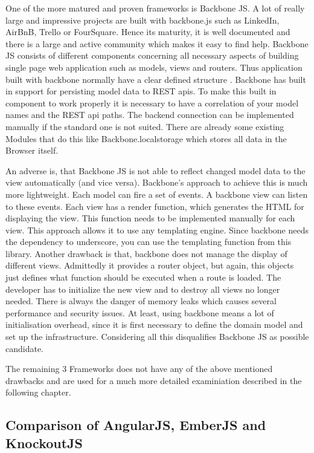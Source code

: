 One of the more matured and proven frameworks is Backbone JS.
A lot of really large and impressive projects are built with backbone.js such as LinkedIn, AirBnB, Trello or FourSquare.
Hence its maturity, it is well documented and there is a large and active community which makes it easy to find help.
Backbone JS  consists of different components concerning all necessary aspects of building single page web application such as models, views and routers.
Thus application built with backbone normally have a clear defined structure \autocite{tech-ana:heise-backbone}.
Backbone has built in support for persisting model data to REST apis.
To make this built in component to work properly it is necessary to have a correlation of your model names and the REST api paths.
The backend connection can be implemented manually if the standard one is not suited.
There are already some existing Modules that do this like Backbone.localstorage which stores all data in the Browser itself.

An adverse is, that Backbone JS is not able to reflect changed model data to the view automatically (and vice versa).
Backbone's approach to achieve this is much more lightweight.
Each model can fire a set of events.
A backbone view can listen to these events.
Each view has a render function, which generates the HTML for displaying the view.
This function needs to be implemented manually for each view.
This approach allows it to use any templating engine.
Since backbone needs the dependency to underscore, you can use the templating function from this library.
Another drawback is that, backbone does not manage the display of different views.
Admittedly it provides a router object, but again, this objects just defines what function should be executed when a route is loaded.
The developer has to initialize the new view and to destroy all views no longer needed.
There is always the danger of memory leaks which causes several performance and security issues.
At least, using backbone means a lot of initialisation overhead, since it is first necessary to define the domain model and set up the infrastructure.
Considering all this disqualifies Backbone JS as possible candidate.
      
The remaining 3 Frameworks does not have any of the above mentioned drawbacks and are used for a much more detailed examiniation described in the following chapter.

\subsection{Comparison of AngularJS, EmberJS and KnockoutJS}\label{chap:detail_comparison}

